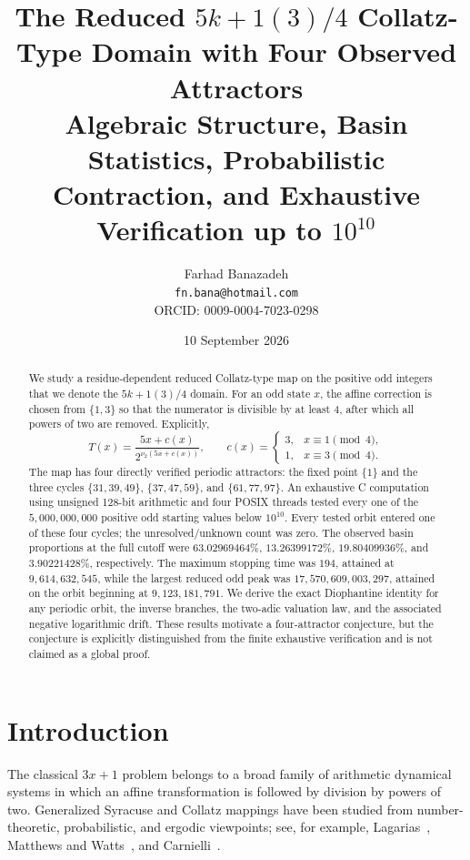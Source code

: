 \documentclass[11pt]{article}
\title{The Reduced $5k+1(3)/4$ Collatz-Type Domain with Four Observed Attractors\\\large Algebraic Structure, Basin Statistics, Probabilistic Contraction, and Exhaustive Verification up to $10^{10}$}
\author{Farhad Banazadeh\\\texttt{fn.bana@hotmail.com}\\ORCID: 0009-0004-7023-0298}
\date{10 September 2026}
\newcommand{\vTwo}{\nu_2}
\begin{document}
\maketitle

\begin{abstract}
We study a residue-dependent reduced Collatz-type map on the positive odd integers that we denote the $5k+1(3)/4$ domain. For an odd state $x$, the affine correction is chosen from $\{1,3\}$ so that the numerator is divisible by at least $4$, after which all powers of two are removed. Explicitly,
\[
T(x)=\frac{5x+c(x)}{2^{\vTwo(5x+c(x))}},\qquad
c(x)=\begin{cases}3,&x\equiv1\pmod4,\\1,&x\equiv3\pmod4.\end{cases}
\]
The map has four directly verified periodic attractors: the fixed point $\{1\}$ and the three cycles $\{31,39,49\}$, $\{37,47,59\}$, and $\{61,77,97\}$. An exhaustive C computation using unsigned 128-bit arithmetic and four POSIX threads tested every one of the $5,000,000,000$ positive odd starting values below $10^{10}$. Every tested orbit entered one of these four cycles; the unresolved/unknown count was zero. The observed basin proportions at the full cutoff were $63.02969464\%$, $13.26399172\%$, $19.80409936\%$, and $3.90221428\%$, respectively. The maximum stopping time was $194$, attained at $9,614,632,545$, while the largest reduced odd peak was $17,570,609,003,297$, attained on the orbit beginning at $9,123,181,791$. We derive the exact Diophantine identity for any periodic orbit, the inverse branches, the two-adic valuation law, and the associated negative logarithmic drift. These results motivate a four-attractor conjecture, but the conjecture is explicitly distinguished from the finite exhaustive verification and is not claimed as a global proof.
\end{abstract}

\section{Introduction}
The classical $3x+1$ problem belongs to a broad family of arithmetic dynamical systems in which an affine transformation is followed by division by powers of two. Generalized Syracuse and Collatz mappings have been studied from number-theoretic, probabilistic, and ergodic viewpoints; see, for example, Lagarias~\cite{Lagarias1985}, Matthews and Watts~\cite{MatthewsWatts1985}, and Carnielli~\cite{Carnielli2015}.
\end{document}
